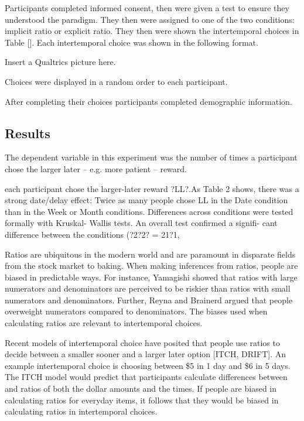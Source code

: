 \documentclass[]{article}
\begin{document}
Participants completed informed consent, then were given a test to ensure they understood the paradigm.
They then were assigned to one of the two conditions: implicit ratio or explicit ratio. 
They then were shown the intertemporal choices in Table []. 
Each intertemporal choice was shown in the following format.

Insert a Qualtrics picture here. 

Choices were displayed in a random order to each participant. 

After completing their choices participants completed demographic information.

\subsection{Results}

The dependent variable in this experiment was the number of times a participant chose the larger later -- e.g. more patient -- reward. 

each participant chose the larger-later reward ?LL?.As Table 2 shows, there was a strong date/delay effect: Twice as many people chose LL in the Date condition than in the Week or Month conditions. Differences across conditions were tested formally with Kruskal- Wallis tests. An overall test confirmed a signifi- cant difference between the conditions (?2?2? = 21?1,






Ratios are ubiquitous in the modern world and are paramount in disparate fields from the stock market to baking. 
When making inferences from ratios, people are biased in predictable ways.
For instance, Yamagishi showed that ratios with large numerators and denominators are perceived to be riskier than ratios with small numerators and denominators. Further, Reyna and Brainerd argued that people overweight numerators compared to denominators.
The biases used when calculating ratios are relevant to intertemporal choices. 

Recent models of intertemporal choice have posited that people use ratios to decide between a smaller sooner and a larger later option [ITCH, DRIFT]. 
An example intertemporal choice is choosing between \$5 in 1 day and \$6 in 5 days. 
The ITCH model would predict that participants calculate differences between and ratios of both the dollar amounts and the times. 
If people are biased in calculating ratios for everyday items, it follows that they would be biased in calculating ratios in intertemporal choices. 
\end{document}
